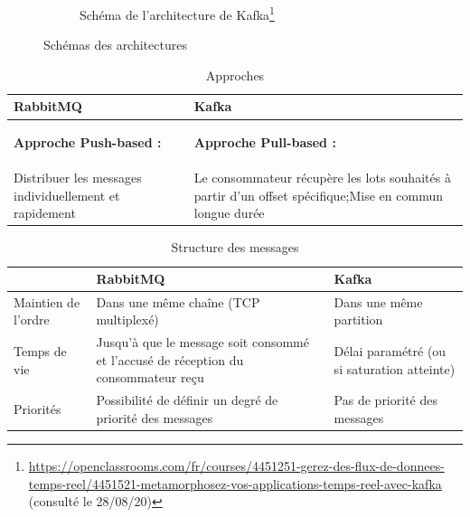 \documentclass[11pt]{article}
\begin{document}
\begin{figure}[hp]
\begin{subfigure}{0.5\textwidth}
					\caption{Schéma de l'architecture de Kafka\footnote{\href{https://openclassrooms.com/fr/courses/4451251-gerez-des-flux-de-donnees-temps-reel/4451521-metamorphosez-vos-applications-temps-reel-avec-kafka}{https://openclassrooms.com/fr/courses/4451251-gerez-des-flux-de-donnees-temps-reel/4451521-metamorphosez-vos-applications-temps-reel-avec-kafka} (consulté le 28/08/20)}}
					\label{fig:archikafka}
				\end{subfigure}
				\caption{Schémas des architectures}
				\label{fig:comparatifarchi}
			\end{figure}
			\medskip
			\begin{table}[hp]
				\begin{tabular}{|p{7.5cm}|p{7.5cm}|}
				\hline
				\rowcolor{lightgray} RabbitMQ & Kafka\\\hline
				\begin{center} \textbf{Approche Push-based :}\end{center} & \begin{center} \textbf{Approche Pull-based :}\end{center}\\\hline
				Distribuer les messages individuellement et rapidement & Le consommateur récupère les lots souhaités à partir d’un offset spécifique;\newline Mise en commun longue durée\\\hline
				\end{tabular}
				\caption{Approches}
				\label{tab:comparatifapp}
			\end{table}
			\medskip
			\begin{table}[hp]
				\begin{tabular}{|p{3cm}|p{6cm}|p{6cm}|}
					\hline
					\rowcolor{lightgray} & RabbitMQ & Kafka\\\hline
					Maintien de l'ordre & Dans une même chaîne (TCP multiplexé) & Dans une même partition\\\hline
					Temps de vie & Jusqu’à que le message soit consommé et l'accusé de réception du consommateur reçu & Délai paramétré (ou si saturation atteinte)\\\hline
					Priorités & Possibilité de définir un degré de priorité des messages & Pas de priorité des messages \\\hline
				\end{tabular}
				\caption{Structure des messages}
				\label{tab:comparatifmess}
			\end{table}
			\medskip
\end{document}
